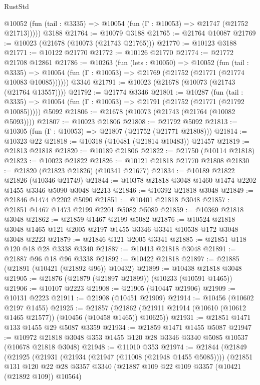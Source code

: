 \begin{lexlean}{RustStd}
\begin{coremodule}
      @10052 (fun (tail : @3335) => @10054 (fun (Γ : @10053) => @21747 (@21752 @21713)))))
    @3188
@21764 := @10079 @3188
@21765 := @21764 @10087
@21769 := @10023 (@21678 (@10073 (@21743 @21765)))
@21770 := @10123 @3188
@21771 := @10122 @21770
@21772 := @10126 @21770
@21774 := @21772 @21708 @12861
@21786 := @10263
    (fun (lets : @10050) =>
    @10052
      (fun (tail : @3335) =>
      @10054 (fun (Γ : @10053) => @21769 (@21752 (@21771 (@21774 @10083 @10085))))))
    @3346
@21791 := @10023 (@21678 (@10073 (@21743 (@21764 @13557))))
@21792 := @21774 @3346
@21801 := @10287
    (fun (tail : @3335) => @10054 (fun (Γ : @10053) => @21791 (@21752 (@21771 (@21792 @10085)))))
    @5092
@21806 := @21678 (@10073 (@21743 (@21764 (@10082 @5093))))
@21807 := @10023 @21806
@21808 := @21792 @5092
@21813 := @10305 (fun (Γ : @10053) => @21807 (@21752 (@21771 @21808)))
@21814 := @10323 @22
@21818 := @10318 (@10481 (@21814 @10483)) @21457
@21819 := @21813 @21818
@21820 := @10189 @21806
@21822 := @21750 (@10114 @21818)
@21823 := @10023 @21822
@21826 := @10121 @21818 @21770 @21808
@21830 := @21820 (@21823 @21826) (@10341 @21677)
@21834 := @10189 @21822 @21826 (@10346 @21749)
@21844 := @10378 @21818 @3048 @1460 @1474 @2202 @1455 @3346 @5090 @3048 @2213
@21846 := @10392 @21818 @3048
@21849 := @21846 @1474 @2202 @5090
@21851 := @10401 @21818 @3048
@21857 := @21851 @1467 @1473 @2199 @2201 @5082 @5089
@21859 := @10369 @21818 @3048
@21862 := @21859 @1467 @2199 @5082
@21876 := @10524 @21818 @3048 @1465 @121 @2005 @2197 @1455 @3346 @3341 @10538 @172 @3048 @3048 @2223
@21879 := @21846 @121 @2005 @3341
@21885 := @21851 @118 @120 @18 @28 @3338 @3340
@21887 := @10413 @21818 @3048
@21891 := @21887 @96 @18 @96 @3338
@21892 := @10422 @21818
@21897 := @21885 (@21891 (@10421 (@21892 @96)) @10432)
@21899 := @10438 @21818 @3048
@21905 := @21876 (@21879 (@21897 @21899)) (@10233 (@10591 @1465))
@21906 := @10107 @2223
@21908 := @21905 (@10447 @21906)
@21909 := @10131 @2223
@21911 := @21908 (@10451 @21909)
@21914 := @10456 (@10602 @2197 @1455)
@21925 := @21857
    (@21862 (@21911 @21914 (@10610 (@10612 @1465 @21577)) (@10456 (@10458 @1465)) @10625))
@21931 := @21851 @1471 @133 @1455 @29 @5087 @3359
@21934 := @21859 @1471 @1455 @5087
@21947 := @10972 @21818 @3048 @353 @1455 @120 @28 @3346 @3340 @5085 @10537 (@10678 @21818 @3048)
@21948 := @11010 @353
@21974 := @21844
    (@21849
      (@21925
        (@21931
          (@21934 (@21947 (@11008 (@21948 @1455 @5085))))
          (@21851
            @131
            @120
            @22
            @28
            @3357
            @3340
            (@21887 @109 @22 @109 @3357 (@10421 (@21892 @109)) @10564)

\end{coremodule}
\end{lexlean}
